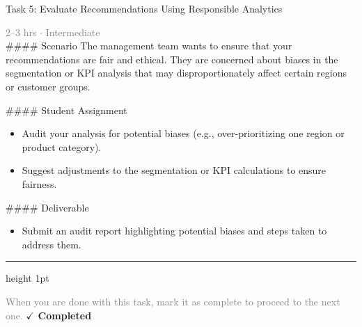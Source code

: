 \documentclass[10pt,a4paper]{article}
\begin{document}
\begin{taskbox}{Task 5: Evaluate Recommendations Using Responsible Analytics}

    {\small \textcolor{gray}{2--3 hrs $\cdot$ Intermediate}}\\[12pt]

    \#\#\#\# Scenario  
The management team wants to ensure that your recommendations are fair and ethical. They are concerned about biases in the segmentation or KPI analysis that may disproportionately affect certain regions or customer groups.  

\#\#\#\# Student Assignment  
\begin{itemize}
    \item Audit your analysis for potential biases (e.g., over-prioritizing one region or product category).  
    \item Suggest adjustments to the segmentation or KPI calculations to ensure fairness.  
\end{itemize}

\#\#\#\# Deliverable  
\begin{itemize}
    \item Submit an audit report highlighting potential biases and steps taken to address them.\par
\end{itemize}

    \vspace{16pt}

    \textcolor{cardBorder}{\hrule height 1pt}\vspace{8pt}

    \small \textcolor{gray}{When you are done with this task, mark it as complete to proceed to the next one.} \hfill \textbf{\textcolor{brandDark}{$\checkmark$ Completed}}

\end{taskbox}
\end{document}
